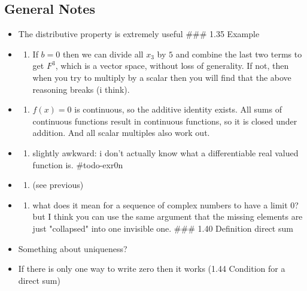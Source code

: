 \documentclass[letterpaper]{article}
\begin{document}
\subsection{General Notes}
\label{sec:orgecc1647}
\begin{itemize}
\item The distributive property is extremely useful \#\#\# 1.35 Example

\item \begin{enumerate}
\item If \(b = 0\) then we can divide all \(x_3\) by \(5\) and combine
the last two terms to get \(F^3\), which is a vector space, without
loss of generality. If not, then when you try to multiply by a
scalar then you will find that the above reasoning breaks (i
think).
\end{enumerate}

\item \begin{enumerate}
\item \(f(x) = 0\) is continuous, so the additive identity exists. All
sums of continuous functions result in continuous functions, so it
is closed under addition. And all scalar multiples also work out.
\end{enumerate}

\item \begin{enumerate}
\item slightly awkward: i don't actually know what a differentiable real
valued function is. \#todo-exr0n
\end{enumerate}

\item \begin{enumerate}
\item (see previous)
\end{enumerate}

\item \begin{enumerate}
\item what does it mean for a sequence of complex numbers to have a limit
\(0\)? but I think you can use the same argument that the missing
elements are just "collapsed" into one invisible one. \#\#\# 1.40
Definition direct sum
\end{enumerate}

\item Something about uniqueness?

\item If there is only one way to write zero then it works (1.44 Condition
for a direct sum)
\end{itemize}
\end{document}

